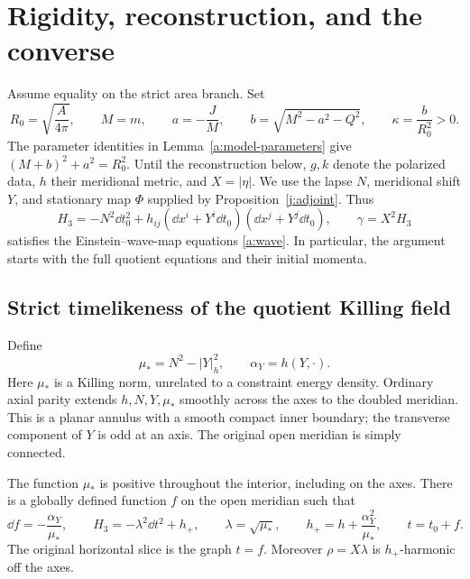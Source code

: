 \section{Rigidity, reconstruction, and the converse}
\label{k:section}

Assume equality on the strict area branch. Set
\[
 R_0=\sqrt{\frac{A}{4\pi}},\qquad M=m,\qquad
 a=-\frac JM,\qquad
 b=\sqrt{M^2-a^2-Q^2},\qquad \kappa=\frac{b}{R_0^2}>0.
\]
The parameter identities in Lemma~\ref{a:model-parameters} give
\((M+b)^2+a^2=R_0^2\). Until the reconstruction below, \(g,k\)
denote the polarized data, \(h\) their meridional metric, and
\(X=|\eta|\). We use the lapse \(N\), meridional shift \(Y\), and
stationary map \(\Phi\) supplied by Proposition~\ref{j:adjoint}.
Thus
\[
 H_3=-N^2\dd t_0^2+h_{ij}(\dd x^i+Y^i\dd t_0)
                  (\dd x^j+Y^j\dd t_0),\qquad \gamma=X^2H_3
\]
satisfies the Einstein--wave-map equations \eqref{a:wave}.
In particular, the argument starts with the full quotient equations
and their initial momenta.

\subsection{Strict timelikeness of the quotient Killing field}

Define
\begin{equation}\label{k:norm}
 \mu_*=N^2-|Y|_h^2,\qquad \alpha_Y=h(Y,\cdot).
\end{equation}
Here \(\mu_*\) is a Killing norm, unrelated to a constraint energy
density. Ordinary axial parity extends \(h,N,Y,\mu_*\) smoothly across
the axes to the doubled meridian. This is a planar annulus with a
smooth compact inner boundary; the transverse component of \(Y\) is
odd at an axis. The original open meridian is simply connected.

\begin{lemma}\label{k:timelike}
The function \(\mu_*\) is positive throughout the interior, including
on the axes. There is a globally defined function \(f\) on the open
meridian such that
\begin{equation}\label{k:static}
 \dd f=-\frac{\alpha_Y}{\mu_*},\qquad
 H_3=-\lambda^2\dd t^2+h_+,\qquad
 \lambda=\sqrt{\mu_*},\qquad
 h_+=h+\frac{\alpha_Y^2}{\mu_*},\qquad t=t_0+f.
\end{equation}
The original horizontal slice is the graph \(t=f\).
Moreover \(\rho=X\lambda\) is \(h_+\)-harmonic off the axes.
\end{lemma}

